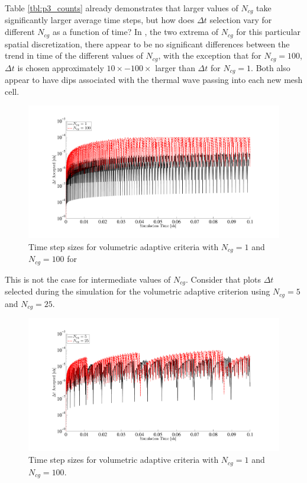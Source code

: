 Table \ref{tbl:p3_counts} already demonstrates that larger values of $N_{cg}$ take significantly larger average time steps, but how does $\Delta t$ selection vary for different $N_{cg}$ as a function of time?
In , the two extrema of $N_{cg}$ for this particular spatial discretization, there appear to be no significant differences between the trend in time of the different values of $N_{cg}$, with the exception that for $N_{cg}=100$, $\Delta t$ is chosen approximately $10\times-100\times$ larger than $\Delta t$ for $N_{cg}=1$.  Both also appear to have dips associated with the thermal wave passing into each new mesh cell.
\begin{figure}[!htp]
\centering
\includegraphics[width=16cm,trim=2in  0.4in 0.5in 0.75in,clip=true]{chapter6_grey_radtran/Dissertation_Data/Volumetric_Trace_1cg_vs_100cg_vs_time.pdf}
\caption{Time step sizes for volumetric adaptive criteria with $N_{cg}=1$ and $N_{cg}=100$ for }
\label{fig:1c_vs_100c}
\end{figure}
This is not the case for intermediate values of $N_{cg}$.  Consider  that plots $\Delta t$ selected during the simulation for the volumetric adaptive criterion using $N_{cg}=5$ and $N_{cg}=25$.
\begin{figure}[!htp]
\centering
\includegraphics[width=16cm,trim=2in  0.4in 0.5in 0.75in,clip=true]{chapter6_grey_radtran/Dissertation_Data/Volumetric_Trace_5cg_vs_25cg_vs_time.pdf}
\caption{Time step sizes for volumetric adaptive criteria with $N_{cg}=1$ and $N_{cg}=100$. }
\label{fig:5c_vs_25c}
\end{figure}
